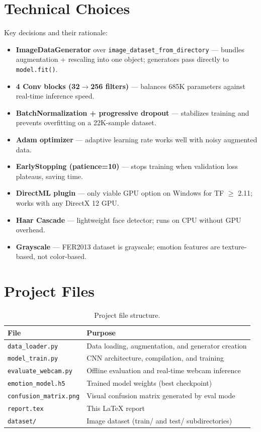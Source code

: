\documentclass[12pt,a4paper]{article}
\begin{document}
\section{Technical Choices}
Key decisions and their rationale:
\begin{itemize}
    \item \textbf{ImageDataGenerator} over \texttt{image\_dataset\_from\_directory} --- bundles augmentation + rescaling into one object; generators pass directly to \texttt{model.fit()}.
    \item \textbf{4 Conv blocks (32$\rightarrow$256 filters)} --- balances 685K parameters against real-time inference speed.
    \item \textbf{BatchNormalization + progressive dropout} --- stabilizes training and prevents overfitting on a 22K-sample dataset.
    \item \textbf{Adam optimizer} --- adaptive learning rate works well with noisy augmented data.
    \item \textbf{EarlyStopping (patience=10)} --- stops training when validation loss plateaus, saving time.
    \item \textbf{DirectML plugin} --- only viable GPU option on Windows for TF $\geq$ 2.11; works with any DirectX 12 GPU.
    \item \textbf{Haar Cascade} --- lightweight face detector; runs on CPU without GPU overhead.
    \item \textbf{Grayscale} --- FER2013 dataset is grayscale; emotion features are texture-based, not color-based.
\end{itemize}

\section{Project Files}
\begin{table}[H]
    \centering
    \caption{Project file structure.}
    \label{tab:files}
    \begin{tabular}{ll}
        \toprule
        File & Purpose \\
        \midrule
        \texttt{data\_loader.py} & Data loading, augmentation, and generator creation \\
        \texttt{model\_train.py} & CNN architecture, compilation, and training \\
        \texttt{evaluate\_webcam.py} & Offline evaluation and real-time webcam inference \\
        \texttt{emotion\_model.h5} & Trained model weights (best checkpoint) \\
        \texttt{confusion\_matrix.png} & Visual confusion matrix generated by eval mode \\
        \texttt{report.tex} & This LaTeX report \\
        \texttt{dataset/} & Image dataset (train/ and test/ subdirectories) \\
        \bottomrule
    \end{tabular}
\end{table}
\end{document}
